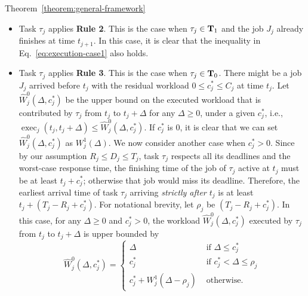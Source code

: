 \begin{appProof}{Theorem~\ref{theorem:general-framework}}
\begin{itemize}
\item Task $\tau_j$ applies {\bf Rule 2}. This is the case when
  $\tau_j \in {\bf T}_1$ and the job $J_j$ already finishes at time
  $t_{j+1}$. In this case, it is clear that the inequality in
  Eq.~\eqref{eq:execution-case1} also holds.

\item Task $\tau_j$ applies {\bf Rule 3}. This is the case when
  $\tau_j \in {\bf T}_0$. There might be a job $J_j$ arrived before $t_j$
  with the residual workload $0 \leq c_j^* \leq C_j$ at time $t_j$.
  Let $\widehat{W}_j^0(\Delta, c_j^*)$ be the upper bound on the
  executed workload that is contributed by $\tau_j$ from $t_j$ to
  $t_j+\Delta$ for any $\Delta \geq 0$, under a given $c_j^*$, i.e., $\operatorname{exec}_j(t_j, t_j+\Delta)\leq \widehat{W}_j^0(\Delta, c_j^*)$. If
  $c_j^*$ is $0$, it is clear that we can set $\widehat{W}_j^0(\Delta, c_j^*)$ as
  $W_j^1(\Delta)$. We now consider another case when $c_j^* > 0$.
  Since by our assumption $R_j \leq D_j \leq T_j$, task $\tau_j$ respects all its deadlines and the
  worst-case response time, the finishing time of the job of $\tau_j$ active at $t_j$ must be at least $t_j + c_j^*$; otherwise that job would miss its
  deadline. Therefore, the earliest arrival time of task $\tau_j$
  arriving \emph{strictly after $t_j$} is at least $t_j + (T_j-R_j +
  c_j^*)$. For notational brevity, let $\rho_j$ be
  $(T_j-R_j + c_j^*)$. In this case, for any $\Delta \geq 0$ and $c_j^* > 0$, the workload $\widehat{W}_j^0(\Delta, c_j^*)$ executed by $\tau_j$ from $t_j$ to $t_j+\Delta$ is upper bounded by
  \begin{equation}
  \label{eq:execution-case2-precise}
  \widehat{W}_j^0(\Delta, c_j^*)=
  \begin{cases}
    \Delta & \mbox{ if } \Delta \leq  c_j^*\\
    c_j^* & \mbox{ if } c_j^* < \Delta \leq  \rho_j\\
   c_j^* + W_j^1(\Delta-\rho_j) & \mbox{ otherwise}.

\end{cases}
\end{equation}
\end{itemize}
\end{appProof}
